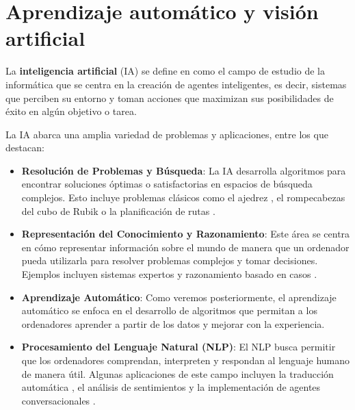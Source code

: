 
\chapter{Aprendizaje automático y visión artificial}
\label{chapter:concepts}

La \textbf{inteligencia artificial} (IA) se define en
\cite{russell2016artificial} como el campo de estudio de la informática que se
centra en la creación de agentes inteligentes, es decir, sistemas que perciben
su entorno y toman acciones que maximizan sus posibilidades de éxito en algún
objetivo o tarea.

La IA abarca una amplia variedad de problemas y aplicaciones, entre los que destacan:

\begin{itemize}
	\item \textbf{Resolución de Problemas y Búsqueda}: La IA desarrolla algoritmos
	para encontrar soluciones óptimas o satisfactorias en espacios de búsqueda complejos.
	Esto incluye problemas clásicos como el ajedrez
	\cite{silver2017masteringchessshogiselfplay}, el rompecabezas del cubo de Rubik
	\cite{rubik} o la planificación de rutas \cite{bast2016route}.
	
	\item \textbf{Representación del Conocimiento y Razonamiento}: Este área se centra
	en cómo representar información sobre el mundo de manera que un ordenador pueda
	utilizarla para resolver problemas complejos y tomar decisiones. Ejemplos
	incluyen sistemas expertos \cite{giarratano1989expert} y razonamiento basado
	en casos \cite{aamodt1994case}.
	
	\item \textbf{Aprendizaje Automático}: Como veremos posteriormente, el
	aprendizaje automático se enfoca en el desarrollo de algoritmos que permitan
	a los ordenadores aprender a partir de los datos y mejorar con la
	experiencia.
	
	\item \textbf{Procesamiento del Lenguaje Natural (NLP)}: El NLP busca permitir
	que los ordenadores comprendan, interpreten y respondan al lenguaje humano
	de manera útil. Algunas aplicaciones de este campo incluyen la traducción automática
	\cite{bahdanau2016neuralmachinetranslationjointly}, el análisis de
	sentimientos \cite{dang2020sentiment} y la implementación de agentes
	conversacionales \cite{brown2020languagemodelsfewshotlearners}.
	

\end{itemize}
